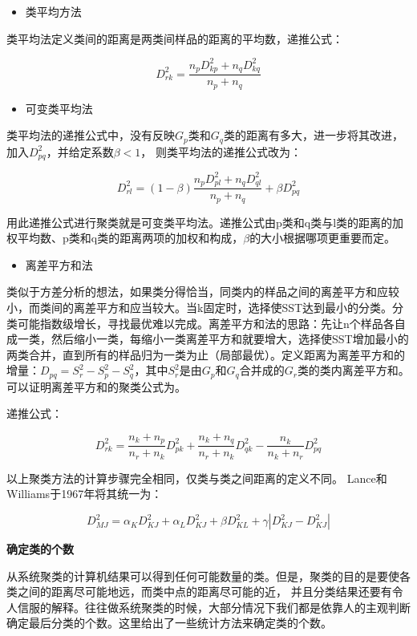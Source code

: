 \documentclass[]{ctexbook}
\providecommand{\tightlist}{%
  \setlength{\itemsep}{0pt}\setlength{\parskip}{0pt}}
\begin{document}
\begin{itemize}
\tightlist
\item
  类平均方法
\end{itemize}

类平均法定义类间的距离是两类间样品的距离的平均数，递推公式：

\[D_{rk}^2=\frac{n_pD_{kp}^2+n_qD_{kq}^2}{n_p+n_q}\]

\begin{itemize}
\tightlist
\item
  可变类平均法
\end{itemize}

类平均法的递推公式中，没有反映\(G_p\)类和\(G_q\)类的距离有多大，进一步将其改进，加入\(D_{pq}^2\)，并给定系数\(\beta<1\)， 则类平均法的递推公式改为：

\[D_{rl}^2=(1-\beta)\frac{n_pD_{pl}^2+n_qD_{ql}^2}{n_p+n_q}+\beta D_{pq}^2\]

用此递推公式进行聚类就是可变类平均法。递推公式由p类和q类与l类的距离的加权平均数、p类和q类的距离两项的加权和构成，\(\beta\)的大小根据哪项更重要而定。

\begin{itemize}
\tightlist
\item
  离差平方和法
\end{itemize}

类似于方差分析的想法，如果类分得恰当，同类内的样品之间的离差平方和应较小，而类间的离差平方和应当较大。当k固定时，选择使SST达到最小的分类。分类可能指数级增长，寻找最优难以完成。离差平方和法的思路：先让n个样品各自成一类，然后缩小一类，每缩小一类离差平方和就要增大，选择使SST增加最小的两类合并，直到所有的样品归为一类为止（局部最优）。定义距离为离差平方和的增量：\(D_{pq}=S_r^2-S_p^2-S_q^2\)，其中\(S_r^2\)是由\(G_p\)和\(G_q\)合并成的\(G_r\)类的类内离差平方和。可以证明离差平方和的聚类公式为。

递推公式：

\[D_{rk}^2=\frac{n_k+n_p}{n_r+n_k}D_{pk}^2+\frac{n_k+n_q}{n_r+n_k}D_{qk}^2-\frac{n_k}{n_k+n_r}D_{pq}^2\]

以上聚类方法的计算步骤完全相同，仅类与类之间距离的定义不同。 Lance和Williams于1967年将其统一为：

\[D_{MJ}^2=\alpha_KD_{KJ}^2+\alpha_LD_{KJ}^2+\beta D_{KL}^2+\gamma|D_{KJ}^2-D_{KJ}^2|\]

\textbf{确定类的个数}

从系统聚类的计算机结果可以得到任何可能数量的类。但是，聚类的目的是要使各类之间的距离尽可能地远，而类中点的距离尽可能的近， 并且分类结果还要有令人信服的解释。往往做系统聚类的时候，大部分情况下我们都是依靠人的主观判断确定最后分类的个数。这里给出了一些统计方法来确定类的个数。
\end{document}
